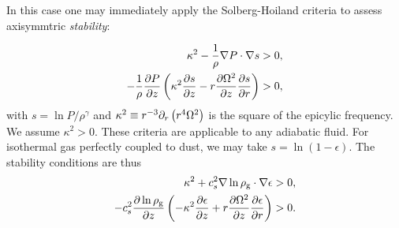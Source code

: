 In this case one may immediately apply the Solberg-Hoiland
criteria to assess axisymmtric \emph{stability}:  

\begin{align}
  \kappa^2 - \frac{1}{\rho}\nabla P \cdot \nabla s &> 0,\\
  -\frac{1}{\rho}\frac{\partial P}{\partial z} \left(\kappa^2 \frac{\partial s}{\partial z} -
  r\frac{\partial\Omega^2}{\partial z}\frac{\partial s}{\partial r}\right) &>0, 
\end{align}
with $s = \ln{P/\rho^\gamma}$ and 
$\kappa^2 \equiv r^{-3}\partial_r\left(r^4\Omega^2\right)$ is the
square of the epicylic frequency. We assume $\kappa^2>0$. 
These criteria are applicable to any adiabatic fluid. For 
isothermal gas perfectly coupled to dust, we may take 
$s=\ln{(1-\epsilon)}$. 
The stability conditions are thus
\begin{align}
  \kappa^2 + c_s^2 \nabla\ln{\rho_\mathrm{g}}\cdot\nabla\epsilon &> 0,\label{dusty_solberg1}  \\
  -c_s^2\frac{\partial\ln{\rho_\mathrm{g}}}{\partial z}\left(-\kappa^2\frac{\partial\epsilon}{\partial
    z} + r\frac{\partial\Omega^2}{\partial z}\frac{\partial \epsilon}{\partial r} \right) & > 0. \label{dusty_solberg2}
\end{align}



